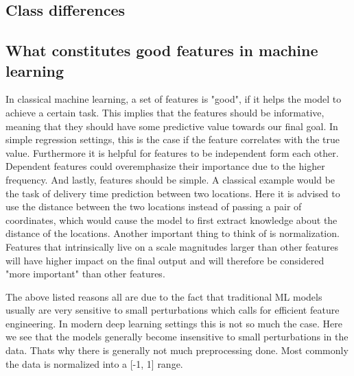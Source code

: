 \documentclass[10pt,a4paper,twoside]{article}
\begin{document}
\subsection{Class differences}

\subsection{What constitutes good features in machine learning}

In classical machine learning, a set of features is "good", if it helps the
model to achieve a certain task. This implies that the features should be
informative, meaning that they should have some predictive value towards our
final goal. In simple regression settings, this is the case if the feature
correlates with the true value. Furthermore it is helpful for features to be
independent form each other. Dependent features could overemphasize their
importance due to the higher frequency. And lastly, features should be simple.
A classical example would be the task of delivery time prediction between two
locations. Here it is advised to use the distance between the two locations
instead of passing a pair of coordinates, which would cause the model to first
extract knowledge about the distance of the locations. Another important thing
to think of is normalization. Features that intrinsically live on a scale
magnitudes larger than other features will have higher impact on the final
output and will therefore be considered "more important" than other features.

The above listed reasons all are due to the fact that traditional ML models
usually are very sensitive to small perturbations which calls for efficient
feature engineering. In modern deep learning settings this is not so much the
case. Here we see that the models generally become insensitive to small
perturbations in the data. Thats why there is generally not much preprocessing
done. Most commonly the data is normalized into a [-1, 1] range.


\end{document}

